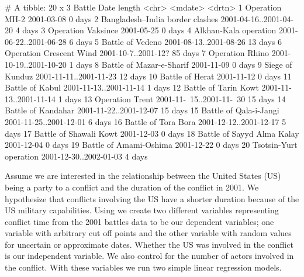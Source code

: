 \documentclass[
]{jss}
\begin{document}
\begin{CodeChunk}
\begin{CodeOutput}
# A tibble: 20 x 3
   Battle                          Date                     length 
   <chr>                           <mdate>                  <drtn> 
 1 Operation MH-2                  2001-03-08                0 days
 2 Bangladesh–India border clashes 2001-04-16..2001-04-20    4 days
 3 Operation Vaksince              2001-05-25                0 days
 4 Alkhan-Kala operation           2001-06-22..2001-06-28    6 days
 5 Battle of Vedeno                2001-08-13..2001-08-26   13 days
 6 Operation Crescent Wind         2001-10-7..2001-12?      85 days
 7 Operation Rhino                 2001-10-19..2001-10-20    1 days
 8 Battle of Mazar-e-Sharif        2001-11-09                0 days
 9 Siege of Kunduz                 2001-11-11..2001-11-23   12 days
10 Battle of Herat                 2001-11-12                0 days
11 Battle of Kabul                 2001-11-13..2001-11-14    1 days
12 Battle of Tarin Kowt            2001-11-13..2001-11-14    1 days
13 Operation Trent                 2001-11-~15..2001-11-~30 15 days
14 Battle of Kandahar              2001-11-22..2001-12-07   15 days
15 Battle of Qala-i-Jangi          2001-11-25..2001-12-01    6 days
16 Battle of Tora Bora             2001-12-12..2001-12-17    5 days
17 Battle of Shawali Kowt          2001-12-03                0 days
18 Battle of Sayyd Alma Kalay      2001-12-04                0 days
19 Battle of Amami-Oshima          2001-12-22                0 days
20 Tsotsin-Yurt operation          2001-12-30..2002-01-03    4 days
\end{CodeOutput}
\end{CodeChunk}

Assume we are interested in the relationship between the United States
(US) being a party to a conflict and the duration of the conflict in
2001. We hypothesize that conflicts involving the US have a shorter
duration because of the US military capabilities. Using 
we create two different variables representing conflict time from the
2001 battles data to be our dependent variables; one variable with
arbitrary cut off points and the other variable with random values for
uncertain or approximate dates. Whether the US was involved in the
conflict is our independent variable. We also control for the number of
actors involved in the conflict. With these variables we run two simple
linear regression models.
\end{document}
